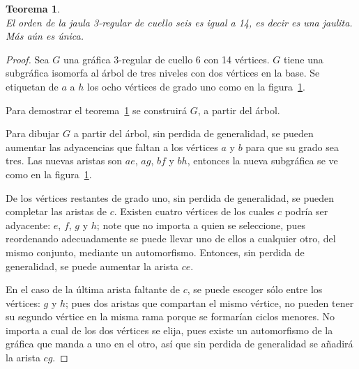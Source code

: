 \documentclass[12pt]{book}
\newtheorem{theorem}{Teorema}
\theoremstyle{definition}
\begin{document}
\begin{theorem}\textbf{}\\\label{teo(3,6)-jaula}
El orden de la jaula 3-regular de cuello seis es igual a 14, es decir
es una jaulita. Más aún es única.  
\end{theorem}

\begin{proof}
Sea $G$ una gráfica 3-regular de cuello 6 con 14 vértices. $G$ tiene
una subgráfica isomorfa al árbol de tres niveles con dos vértices en
la base. Se etiquetan de $a$ a $h$ los ocho vértices de grado uno como
en la figura~\ref{arbol(3,6)}.

Para demostrar el teorema~\ref{teo(3,6)-jaula} se construirá $G$, a
partir del árbol.

Para dibujar $G$ a partir del árbol, sin perdida de generalidad, se pueden
aumentar las adyacencias que faltan a los vértices $a$ y $b$ para que
su grado sea tres. Las nuevas aristas son $ae$, $ag$, $bf$ y $bh$,
entonces la nueva subgráfica se ve como en la figura~\ref{arbol(3,6)}.

\begin{figure}
  \centering
  \caption{} \label{arbol(3,6)}
\end{figure}

De los vértices restantes de grado uno, sin perdida de generalidad, se
pueden completar las aristas de $c$. Existen cuatro vértices de los
cuales $c$ podría ser adyacente: $e$,
$f$, $g$ y $h$; note que no importa a quien se seleccione, pues
reordenando adecuadamente se puede llevar uno de ellos a cualquier
otro, del mismo conjunto, mediante un automorfismo. Entonces, sin perdida de generalidad, se
puede aumentar la arista $ce$.

En el caso de la última arista faltante de $c$,
se puede escoger sólo entre los vértices: $g$ y $h$; pues dos aristas
que compartan el
mismo vértice, no pueden tener su segundo vértice
en la misma rama porque se formarían ciclos menores.
No importa a cual de los dos vértices se elija, pues existe
un automorfismo de la gráfica que manda a uno en el otro, así que sin
perdida de generalidad se añadirá la arista $cg$. 


\end{proof}
\end{document}
